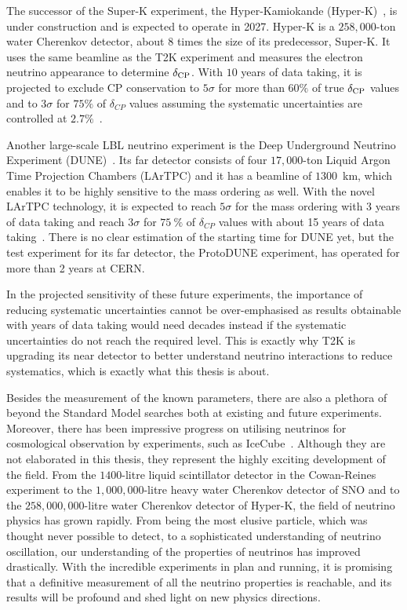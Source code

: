 The successor of the Super-K experiment, the Hyper-Kamiokande (Hyper-K)~\cite{Hyper-Kamiokande:2018ofw}, is under construction and is expected to operate in 2027.
Hyper-K is a $258,000$-ton water Cherenkov detector, about $8$ times the size of its predecessor, Super-K.
It uses the same beamline as the T2K experiment and measures the electron neutrino appearance to determine $\delta_\textrm{CP}$.
With $10$ years of data taking, it is projected to exclude CP conservation to $5\sigma$ for more than $60\%$ of true $\delta_\textrm{CP}$ values and to $3\sigma$ for $75\%$ of $\delta_{CP}$ values assuming the systematic uncertainties are controlled at $2.7\%$~\cite{Jesus-Valls:2024ady}.

Another large-scale LBL neutrino experiment is the Deep Underground Neutrino Experiment (DUNE)~\cite{DUNE:2016hlj,DUNE:2015lol,DUNE:2016evb,DUNE:2016rla,DUNE:2021tad}.
Its far detector consists of four $17,000$-ton Liquid Argon Time Projection Chambers (LArTPC) and it has a beamline of $1300$~km, which enables it to be highly sensitive to the mass ordering as well.
With the novel LArTPC technology, it is expected to reach $5\sigma$ for the mass ordering with 3 years of data taking and reach $3\sigma$ for $75~\%$ of $\delta_{CP}$ values with about 15 years of data taking~\cite{Gil-Botella:2024duf}.
There is no clear estimation of the starting time for DUNE yet, but the test experiment for its far detector, the ProtoDUNE experiment, has operated for more than 2 years at CERN.

In the projected sensitivity of these future experiments, the importance of reducing systematic uncertainties cannot be over-emphasised as results obtainable with years of data taking would need decades instead if the systematic uncertainties do not reach the required level.
This is exactly why T2K is upgrading its near detector to better understand neutrino interactions to reduce systematics, which is exactly what this thesis is about.

Besides the measurement of the known parameters, there are also a plethora of beyond the Standard Model searches both at existing and future experiments.
Moreover, there has been impressive progress on utilising neutrinos for cosmological observation by experiments, such as IceCube~\cite{IceCube:2023ame}.
Although they are not elaborated in this thesis, they represent the highly exciting development of the field.
From the $1400$-litre liquid scintillator detector in the Cowan-Reines experiment to the $1,000,000$-litre heavy water Cherenkov detector of SNO and to the $258,000,000$-litre water Cherenkov detector of Hyper-K, the field of neutrino physics has grown rapidly.
From being the most elusive particle, which was thought never possible to detect, to a sophisticated understanding of neutrino oscillation, our understanding of the properties of neutrinos has improved drastically.
With the incredible experiments in plan and running, it is promising that a definitive measurement of all the neutrino properties is reachable, and its results will be profound and shed light on new physics directions.
